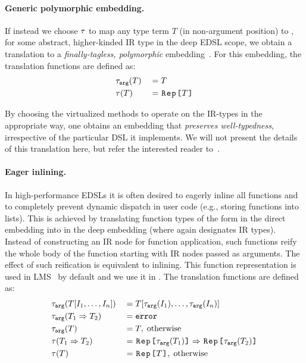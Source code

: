 \paragraph{Generic polymorphic embedding.} If instead we choose
$\ttother$ to map any type term $T$ (in non-argument position)
to , for some abstract, higher-kinded IR type
 in the deep EDSL scope, we obtain a translation to a
\emph{finally-tagless, polymorphic}
embedding~\cite{carette_finally_2009,hofer_polymorphic_2008}. For this
embedding, the translation functions are defined as:
\begin{alignat*}{2}
&\ttarg[T]   & \; = \; & T \\
&\ttother[T] & \; = \; & \text{\code{Rep[}} T \text{\code{]}}
\end{alignat*}

By choosing the virtualized methods to operate on the IR-types in the
appropriate way, one obtains an embedding that \emph{preserves
  well-typedness}, irrespective of the particular DSL it implements.
We will not present the details of this translation here, but refer
the interested reader to~\cite{carette_finally_2009}.

\paragraph{Eager inlining.} In high-performance EDSLs it is often desired to
eagerly inline all functions and to completely prevent dynamic dispatch in
user code (e.g., storing functions into lists).  This is achieved by translating
function types of the form  in the direct embedding into
 in the deep embedding (where  again
designates IR types). Instead of constructing an IR node for function application, such functions reify the
whole body of the function starting with IR nodes passed as arguments. The effect of such
reification is equivalent to inlining. This function representation is used in LMS~\cite{rompf_lightweight_2012} by default
and we use it in . The translation functions are defined as:
\renewcommand*{\mathellipsis}{%
  \mathinner{{\ldotp}{\ldotp}{\ldotp}}%
}
\begin{alignat*}{3}
&\ttarg[T\lbrack I_1,\ldots,I_n \rbrack]   & \; = \; & T[\ttarg[I_1],\ldots,\ttarg[I_n]] \\
&\ttarg[T_1 \Rightarrow T_2] & \; = \; & \mathtt{error} \\
&\ttarg[T] & \; = \; & T, \; \text{otherwise} \\ %
&\ttother[T_1 \Rightarrow T_2] & \; = \; & \text{\code{Rep[}}\ttarg[T_1]\text{\code{]}} \Rightarrow \text{\code{Rep[}}\ttarg[T_2]\text{\code{]}}\\
&\ttother[T] & \; = \; & \text{\code{Rep[}} T \text{\code{]}},
\; \text{otherwise}
\end{alignat*} %

